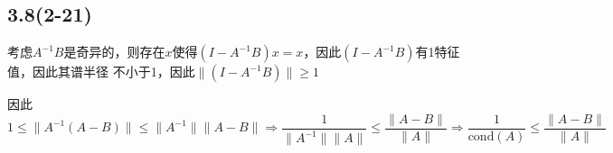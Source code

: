 \documentclass[UTF8,zihao=5]{ctexart}
\newcommand*{\av}[1]{\left\langle{#1}\right\rangle}
\begin{document}
\subsection*{3.8(2-21)}

考虑$A^{-1}B$是奇异的，则存在$x$使得$(I-A^{-1}B)x=x$，因此$(I-A^{-1}B)$有1特征值，因此其谱半径
不小于1，因此$\|(I-A^{-1}B)\|\geq 1$

因此
$$
1\leq\|A^{-1}(A-B)\|\leq\|A^{-1}\|\|A-B\|\Rightarrow
\frac{1}{\|A^{-1}\|\|A\|}\leq\frac{\|A-B\|}{\|A\|}\Rightarrow
\frac{1}{\mathrm{cond}(A)}\leq\frac{\|A-B\|}{\|A\|}
$$












\end{document}
